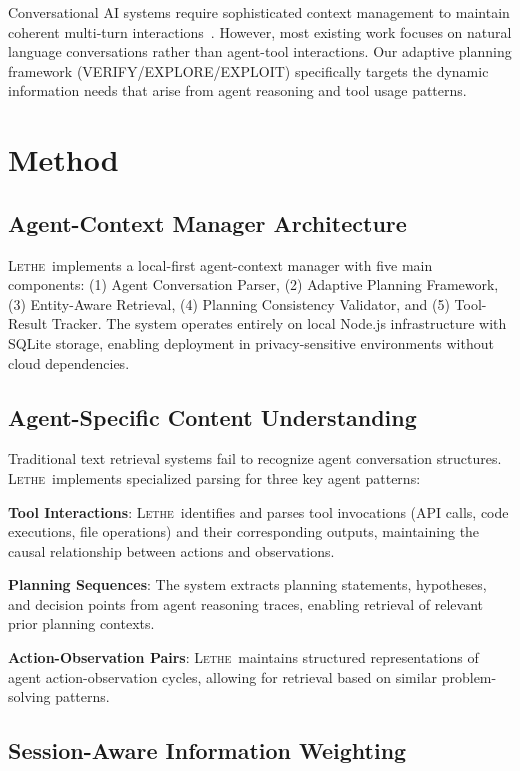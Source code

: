 \documentclass[letterpaper]{article}
\newcommand{\lethe}{\textsc{Lethe}}
\begin{document}
Conversational AI systems require sophisticated context management to maintain coherent multi-turn interactions~\citep{yu2021few}. However, most existing work focuses on natural language conversations rather than agent-tool interactions. Our adaptive planning framework (VERIFY/EXPLORE/EXPLOIT) specifically targets the dynamic information needs that arise from agent reasoning and tool usage patterns.

\section{Method}

\subsection{Agent-Context Manager Architecture}

\lethe\ implements a local-first agent-context manager with five main components: (1) Agent Conversation Parser, (2) Adaptive Planning Framework, (3) Entity-Aware Retrieval, (4) Planning Consistency Validator, and (5) Tool-Result Tracker. The system operates entirely on local Node.js infrastructure with SQLite storage, enabling deployment in privacy-sensitive environments without cloud dependencies.

\subsection{Agent-Specific Content Understanding}

Traditional text retrieval systems fail to recognize agent conversation structures. \lethe\ implements specialized parsing for three key agent patterns:

\textbf{Tool Interactions}: \lethe\ identifies and parses tool invocations (API calls, code executions, file operations) and their corresponding outputs, maintaining the causal relationship between actions and observations.

\textbf{Planning Sequences}: The system extracts planning statements, hypotheses, and decision points from agent reasoning traces, enabling retrieval of relevant prior planning contexts.

\textbf{Action-Observation Pairs}: \lethe\ maintains structured representations of agent action-observation cycles, allowing for retrieval based on similar problem-solving patterns.

\subsection{Session-Aware Information Weighting}
\end{document}
